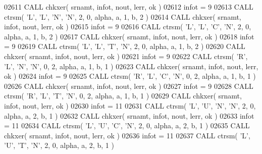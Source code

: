 \begin{DoxyCode}
02611       \textcolor{keyword}{CALL }chkxer( srnamt, infot, nout, lerr, ok )
02612       infot = 9
02613       \textcolor{keyword}{CALL }ctrsm( \textcolor{stringliteral}{'L'}, \textcolor{stringliteral}{'L'}, \textcolor{stringliteral}{'N'}, \textcolor{stringliteral}{'N'}, 2, 0, alpha, a, 1, b, 2 )
02614       \textcolor{keyword}{CALL }chkxer( srnamt, infot, nout, lerr, ok )
02615       infot = 9
02616       \textcolor{keyword}{CALL }ctrsm( \textcolor{stringliteral}{'L'}, \textcolor{stringliteral}{'L'}, \textcolor{stringliteral}{'C'}, \textcolor{stringliteral}{'N'}, 2, 0, alpha, a, 1, b, 2 )
02617       \textcolor{keyword}{CALL }chkxer( srnamt, infot, nout, lerr, ok )
02618       infot = 9
02619       \textcolor{keyword}{CALL }ctrsm( \textcolor{stringliteral}{'L'}, \textcolor{stringliteral}{'L'}, \textcolor{stringliteral}{'T'}, \textcolor{stringliteral}{'N'}, 2, 0, alpha, a, 1, b, 2 )
02620       \textcolor{keyword}{CALL }chkxer( srnamt, infot, nout, lerr, ok )
02621       infot = 9
02622       \textcolor{keyword}{CALL }ctrsm( \textcolor{stringliteral}{'R'}, \textcolor{stringliteral}{'L'}, \textcolor{stringliteral}{'N'}, \textcolor{stringliteral}{'N'}, 0, 2, alpha, a, 1, b, 1 )
02623       \textcolor{keyword}{CALL }chkxer( srnamt, infot, nout, lerr, ok )
02624       infot = 9
02625       \textcolor{keyword}{CALL }ctrsm( \textcolor{stringliteral}{'R'}, \textcolor{stringliteral}{'L'}, \textcolor{stringliteral}{'C'}, \textcolor{stringliteral}{'N'}, 0, 2, alpha, a, 1, b, 1 )
02626       \textcolor{keyword}{CALL }chkxer( srnamt, infot, nout, lerr, ok )
02627       infot = 9
02628       \textcolor{keyword}{CALL }ctrsm( \textcolor{stringliteral}{'R'}, \textcolor{stringliteral}{'L'}, \textcolor{stringliteral}{'T'}, \textcolor{stringliteral}{'N'}, 0, 2, alpha, a, 1, b, 1 )
02629       \textcolor{keyword}{CALL }chkxer( srnamt, infot, nout, lerr, ok )
02630       infot = 11
02631       \textcolor{keyword}{CALL }ctrsm( \textcolor{stringliteral}{'L'}, \textcolor{stringliteral}{'U'}, \textcolor{stringliteral}{'N'}, \textcolor{stringliteral}{'N'}, 2, 0, alpha, a, 2, b, 1 )
02632       \textcolor{keyword}{CALL }chkxer( srnamt, infot, nout, lerr, ok )
02633       infot = 11
02634       \textcolor{keyword}{CALL }ctrsm( \textcolor{stringliteral}{'L'}, \textcolor{stringliteral}{'U'}, \textcolor{stringliteral}{'C'}, \textcolor{stringliteral}{'N'}, 2, 0, alpha, a, 2, b, 1 )
02635       \textcolor{keyword}{CALL }chkxer( srnamt, infot, nout, lerr, ok )
02636       infot = 11
02637       \textcolor{keyword}{CALL }ctrsm( \textcolor{stringliteral}{'L'}, \textcolor{stringliteral}{'U'}, \textcolor{stringliteral}{'T'}, \textcolor{stringliteral}{'N'}, 2, 0, alpha, a, 2, b, 1 )

\end{DoxyCode}
